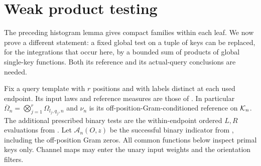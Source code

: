 \section{Weak product testing}\label{sec:product-tests}

The preceding histogram lemma gives compact families within each
leaf. We now prove a different statement: a fixed global test on a
tuple of keys can be replaced, for the integrations that occur here,
by a bounded sum of products of global single-key functions. Both its
reference and its actual-query conclusions are needed.

Fix a query template with $r$ positions and with labels distinct at
each used endpoint. Its input laws and reference measures are those
of . In particular
$\overline\Omega_n=\bigotimes_{j=1}^r\Omega_{l_j,q_j,n}$ and
$\nu_n$ is its off-position-Gram-conditioned reference on $\mathcal K_n$.
The additional prescribed binary tests are the within-endpoint
ordered $L,R$ evaluations from . Let
$\mathcal A_n(O,z)$ be the successful binary indicator from
, including the off-position Gram zeros.
All common functions below inspect primal keys only. Channel maps
may enter the unary input weights and the orientation filters.

